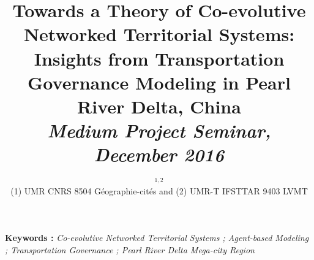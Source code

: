 


\title{Towards a Theory of Co-evolutive Networked Territorial Systems: Insights from Transportation Governance Modeling in Pearl River Delta, China\\\bigskip
\bigskip
\bigskip
\textit{Medium Project Seminar, December 2016}
}\bigskip
\bigskip
\author{$^{1,2}$\\
\small(1) UMR CNRS 8504 Géographie-cités and (2) UMR-T IFSTTAR 9403 LVMT
}
\date{}

\maketitle

\justify




\vspace{0.2cm}

\textbf{Keywords : }\textit{Co-evolutive Networked Territorial Systems ; Agent-based Modeling ; Transportation Governance ; Pearl River Delta Mega-city Region}

\vspace{0.5cm}

%
%
%

